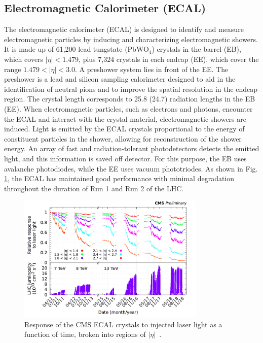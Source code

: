\subsection{Electromagnetic Calorimeter (ECAL)}
The electromagnetic calorimeter (ECAL) is designed to identify and measure electromagnetic particles by inducing and characterizing electromagnetic showers. 
It is made up of 61,200 lead tungstate (PbWO$_4$) crystals in the barrel (EB), which covers $|\eta| < 1.479$, plus 7,324 crystals in each endcap (EE), which cover the range $1.479 < |\eta| < 3.0$. A preshower system lies in front of the EE. The preshower is a lead and silicon sampling calorimeter designed to aid in the identification of neutral pions and to improve the spatial resolution in the 
endcap region. 
The crystal length corresponds to 25.8 (24.7) radiation lengths in the EB (EE). When electromagnetic particles, such as 
electrons and photons, encounter the ECAL and interact with the crystal material, electromagnetic showers are induced. 
Light is emitted by the ECAL crystals proportional to the energy of constituent particles in the shower, allowing 
for reconstruction of the shower energy. An array of fast and radiation-tolerant photodetectors detects the emitted light, and this information is saved off detector. 
For this purpose, the EB uses avalanche photodiodes, while the EE uses vacuum phototriodes. As shown in Fig. \ref{fig:cms_ecal_response}, the ECAL has maintained good performance with minimal degradation throughout the duration of Run 1 and Run 2 of the LHC.

\begin{figure}[tb]
  \centering
   \includegraphics[width=0.8\textwidth]{fig/experiment/detector/cms_ecal_response.png}
	\caption[Response of the CMS ECAL crystals to injected laser light as a function of time, broken into regions of $|\eta|$.]
	{Response of the CMS ECAL crystals to injected laser light as a function of time, broken into regions of $|\eta|$~\cite{Cavallari:2798128}.}
	\label{fig:cms_ecal_response}
\end{figure}

